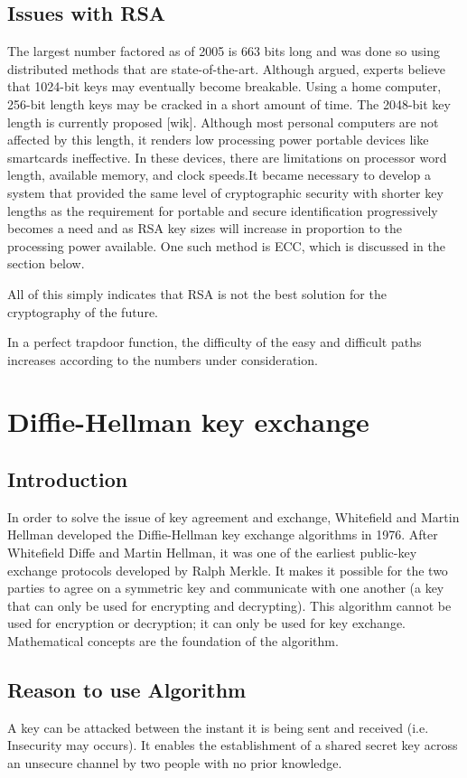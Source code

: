 \documentclass{article}
\begin{document}
\subsection{Issues with RSA}
The largest number factored as of 2005 is 663 bits long and was done so using distributed methods that are state-of-the-art. Although argued, experts believe that 1024-bit keys may eventually become breakable. Using a home computer, 256-bit length keys may be cracked in a short amount of time. The 2048-bit key length is currently proposed [wik]. Although most personal computers are not affected by this length, it renders low processing power portable devices like smartcards ineffective. In these devices, there are limitations on processor word length, available memory, and clock speeds.It became necessary to develop a system that provided the same level of cryptographic security with shorter key lengths as the requirement for portable and secure identification progressively becomes a need and as RSA key sizes will increase in proportion to the processing power available. One such method is ECC, which is discussed in the section below.

All of this simply indicates that RSA is not the best solution for the cryptography of the future.

In a perfect trapdoor function, the difficulty of the easy and difficult paths increases according to the numbers under consideration.
\newpage
\section{Diffie-Hellman key exchange}
\subsection{Introduction}
In order to solve the issue of key agreement and exchange, Whitefield and Martin Hellman developed the Diffie-Hellman key exchange algorithms in 1976. After Whitefield Diffe and Martin Hellman, it was one of the earliest public-key exchange protocols developed by Ralph Merkle. It makes it possible for the two parties to agree on a symmetric key and communicate with one another (a key that can only be used for encrypting and decrypting).
This algorithm cannot be used for encryption or decryption; it can only be used for key exchange. Mathematical concepts are the foundation of the algorithm.
\subsection{Reason to use Algorithm}
A key can be attacked between the instant it is being sent and received (i.e. Insecurity may occurs). It enables the establishment of a shared secret key across an unsecure channel by two people with no prior knowledge.
\end{document}
